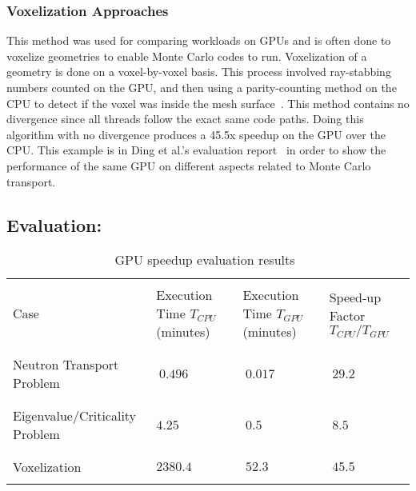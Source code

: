 \subsubsection*{\textbf{Voxelization Approaches}}

This method was used for comparing workloads on GPUs and is often done to voxelize geometries to enable Monte Carlo codes to run.
%
Voxelization of a geometry is done on a voxel-by-voxel basis.
%
This process involved ray-stabbing numbers counted on the GPU, and then using a parity-counting method on the CPU to detect if the voxel was inside the mesh surface~\cite{na2010deformable}.
%
This method contains no divergence since all threads follow the exact same code paths.
%
Doing this algorithm with no divergence produces a 45.5x speedup on the GPU over the CPU.
%
This example is in Ding et al.'s evaluation report~\cite{ding2011evaluation} in order to show the performance of the same GPU on different aspects related to Monte Carlo transport.

\subsection*{ \textbf{Evaluation:}}

\begin{table}
\caption { GPU speedup evaluation results~\cite{ding2011evaluation} } \label{tab:GPUPerfEval} 
\begin{center}
\begin{tabular}{ |C{.10\textwidth}|C{.10\textwidth}|C{.10\textwidth}|C{.10\textwidth}|}
\hline
 & & & \\
Case & Execution Time $T_{CPU}$ (minutes) & Execution Time $T_{GPU}$ (minutes) & Speed-up Factor $T_{CPU}/T_{GPU}$ \\
 & & & \\
 \hline
 & & & \\
Neutron Transport Problem & $~ 0.496$ & $ ~0.017$ & $~ 29.2$ \\ 
 & & & \\
\hline
 & & & \\
Eigenvalue/Criticality Problem & $ 4.25 $ & $ ~ 0.5 $ & $ ~ 8.5 $ \\
 & & & \\
\hline
 & & & \\
Voxelization & $ 2380.4 $ & $ ~ 52.3 $ & $~ 45.5 $ \\
 & & & \\
\hline
\end{tabular}
\end{center}
\end{table}

